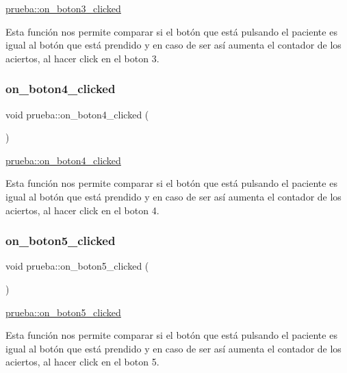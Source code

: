 \hyperlink{classprueba_a622258b2f43536c572613dc4bc3e4e65}{prueba\+::on\+\_\+boton3\+\_\+clicked} 

Esta función nos permite comparar si el botón que está pulsando el paciente es igual al botón que está prendido y en caso de ser así aumenta el contador de los aciertos, al hacer click en el boton 3. \mbox{\label{classprueba_a3de0793fdcb9d6c63382a665ba435736}} 
\subsubsection{\texorpdfstring{on\+\_\+boton4\+\_\+clicked}{on\_boton4\_clicked}}
{\footnotesize\ttfamily void prueba\+::on\+\_\+boton4\+\_\+clicked (\begin{DoxyParamCaption}{ }\end{DoxyParamCaption})\hspace{0.3cm}{\ttfamily [slot]}}



\hyperlink{classprueba_a3de0793fdcb9d6c63382a665ba435736}{prueba\+::on\+\_\+boton4\+\_\+clicked} 

Esta función nos permite comparar si el botón que está pulsando el paciente es igual al botón que está prendido y en caso de ser así aumenta el contador de los aciertos, al hacer click en el boton 4. \mbox{\label{classprueba_a5fe7941d4155bd83e2746e6d29aa9bdb}} 
\subsubsection{\texorpdfstring{on\+\_\+boton5\+\_\+clicked}{on\_boton5\_clicked}}
{\footnotesize\ttfamily void prueba\+::on\+\_\+boton5\+\_\+clicked (\begin{DoxyParamCaption}{ }\end{DoxyParamCaption})\hspace{0.3cm}{\ttfamily [slot]}}



\hyperlink{classprueba_a5fe7941d4155bd83e2746e6d29aa9bdb}{prueba\+::on\+\_\+boton5\+\_\+clicked} 

Esta función nos permite comparar si el botón que está pulsando el paciente es igual al botón que está prendido y en caso de ser así aumenta el contador de los aciertos, al hacer click en el boton 5. \mbox{\label{classprueba_a8d324e5b5d7e37fd16e9e287bbcb5ea5}} 
